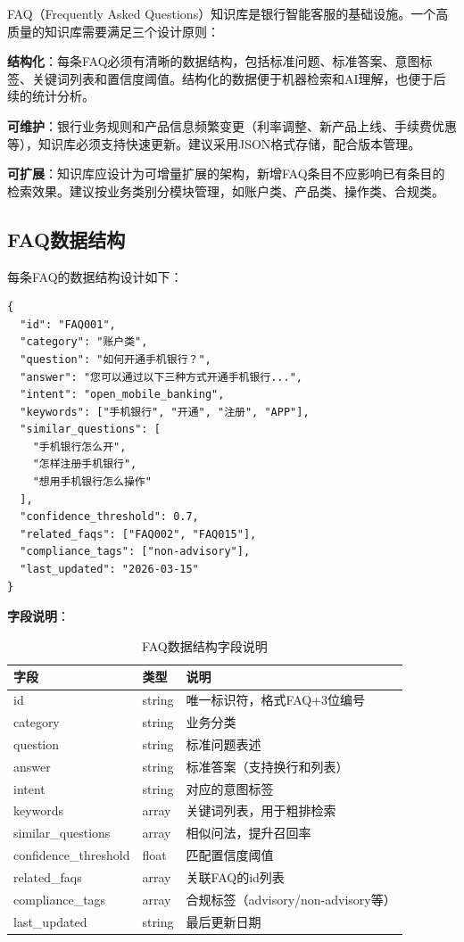 FAQ（Frequently Asked Questions）知识库是银行智能客服的基础设施。一个高质量的知识库需要满足三个设计原则：

\textbf{结构化}：每条FAQ必须有清晰的数据结构，包括标准问题、标准答案、意图标签、关键词列表和置信度阈值。结构化的数据便于机器检索和AI理解，也便于后续的统计分析。

\textbf{可维护}：银行业务规则和产品信息频繁变更（利率调整、新产品上线、手续费优惠等），知识库必须支持快速更新。建议采用JSON格式存储，配合版本管理。

\textbf{可扩展}：知识库应设计为可增量扩展的架构，新增FAQ条目不应影响已有条目的检索效果。建议按业务类别分模块管理，如账户类、产品类、操作类、合规类。

\subsection{FAQ数据结构}

每条FAQ的数据结构设计如下：

\begin{lstlisting}[style=json]
{
  "id": "FAQ001",
  "category": "账户类",
  "question": "如何开通手机银行？",
  "answer": "您可以通过以下三种方式开通手机银行...",
  "intent": "open_mobile_banking",
  "keywords": ["手机银行", "开通", "注册", "APP"],
  "similar_questions": [
    "手机银行怎么开",
    "怎样注册手机银行",
    "想用手机银行怎么操作"
  ],
  "confidence_threshold": 0.7,
  "related_faqs": ["FAQ002", "FAQ015"],
  "compliance_tags": ["non-advisory"],
  "last_updated": "2026-03-15"
}
\end{lstlisting}

\textbf{字段说明}：

\begin{table}[H]
\centering
\small
\begin{tabular}{llp{6.5cm}}
\toprule
\textbf{字段} & \textbf{类型} & \textbf{说明} \\
\midrule
id & string & 唯一标识符，格式FAQ+3位编号 \\
category & string & 业务分类 \\
question & string & 标准问题表述 \\
answer & string & 标准答案（支持换行和列表） \\
intent & string & 对应的意图标签 \\
keywords & array & 关键词列表，用于粗排检索 \\
similar\_questions & array & 相似问法，提升召回率 \\
confidence\_threshold & float & 匹配置信度阈值 \\
related\_faqs & array & 关联FAQ的id列表 \\
compliance\_tags & array & 合规标签（advisory/non-advisory等） \\
last\_updated & string & 最后更新日期 \\
\bottomrule
\end{tabular}
\caption{FAQ数据结构字段说明}
\end{table}

